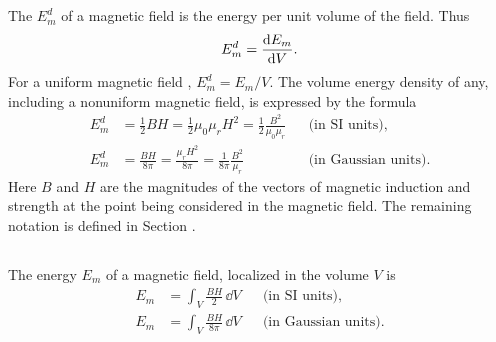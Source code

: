 \subsection{}\label{25.4.3} The  $E_{m}^{d}$ of a magnetic field is the energy per unit volume of the field. Thus
\begin{equation*}%
E_{m}^{d} = \dv{E_{m}}{V}.
\end{equation*}
For a uniform magnetic field , $E_{m}^{d} = E_{m}/V$.
The volume energy density of any, including a nonuniform magnetic field, is expressed by the formula
\begin{align*}%
E_{m}^{d} & =  \frac{1}{2} BH = \frac{1}{2} \mu_{0}\mu_{r}  H^{2} = \frac{1}{2} \frac{B^{2}}{\mu_{0}\mu_{r} }&& \text{(in SI units),} \\
E_{m}^{d} & =  \frac{BH}{8\pi}  = \frac{\mu_{r}  H^{2}}{8 \pi} = \frac{1}{8 \pi} \frac{B^{2}}{\mu_{r} }&&  \text{(in Gaussian units).}
\end{align*}Here $B$ and $H$ are the magnitudes of the vectors of magnetic induction  and strength  at the point being considered in the magnetic field. The remaining notation is defined in Section .

\subsection{}\label{25.4.4} The energy $E_{m}$ of a magnetic field, localized in the volume $V$ is
\begin{align*}%
E_{m} & =  \int_{V} \frac{BH}{2}\, \dd V&& \text{(in SI units),} \\
E_{m} &  = \int_{V} \frac{BH}{8\pi}\, \dd V &&  \text{(in Gaussian units).}
\end{align*}
